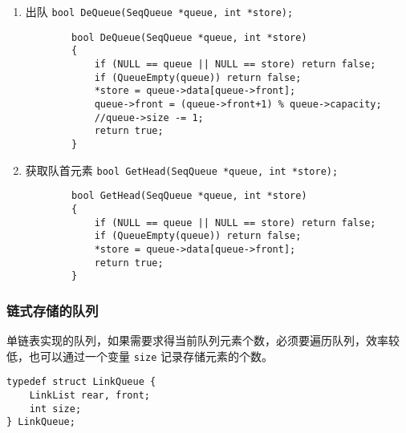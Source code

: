 \documentclass{ctexart}
\begin{document}
\begin{enumerate}
    \item 出队 \texttt{bool DeQueue(SeqQueue *queue, int *store);}
        \begin{verbatim}
        bool DeQueue(SeqQueue *queue, int *store)
        {
            if (NULL == queue || NULL == store) return false;
            if (QueueEmpty(queue)) return false;
            *store = queue->data[queue->front];
            queue->front = (queue->front+1) % queue->capacity;
            //queue->size -= 1;
            return true;
        }
        \end{verbatim}

    \item 获取队首元素 \texttt{bool GetHead(SeqQueue *queue, int *store);}
        \begin{verbatim}
        bool GetHead(SeqQueue *queue, int *store)
        {
            if (NULL == queue || NULL == store) return false;
            if (QueueEmpty(queue)) return false;
            *store = queue->data[queue->front];
            return true;
        }
        \end{verbatim}

\end{enumerate}

\subsubsection{链式存储的队列}
单链表实现的队列，如果需要求得当前队列元素个数，必须要遍历队列，效率较低，也可以通过一个变量 \texttt{size} 记录存储元素的个数。
\begin{verbatim}
typedef struct LinkQueue {
    LinkList rear, front;
    int size;
} LinkQueue;
\end{verbatim}
\end{document}

